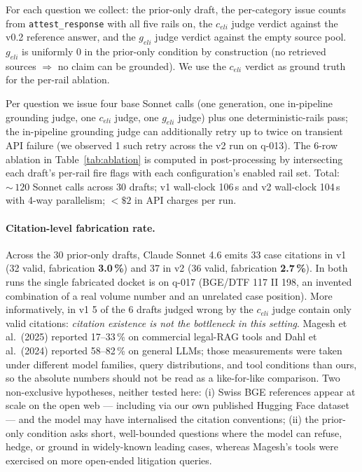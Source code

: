 \documentclass[11pt,a4paper]{article}
\begin{document}
For each question we collect: the prior-only draft,
the per-category issue counts from
\texttt{attest\_response} with all five rails on,
the $c_{eli}$ judge verdict against the v0.2 reference
answer, and the $g_{eli}$ judge verdict against the
empty source pool.  $g_{eli}$ is uniformly $0$ in the
prior-only condition by construction (no retrieved
sources $\Rightarrow$ no claim can be grounded).
We use the $c_{eli}$ verdict as ground truth for
the per-rail ablation.

Per question we issue four base Sonnet calls (one
generation, one in-pipeline grounding judge, one
$c_{eli}$ judge, one $g_{eli}$ judge) plus one
deterministic-rails pass; the in-pipeline grounding
judge can additionally retry up to twice on transient
API failure (we observed 1 such retry across the v2
run on q-013).  The 6-row ablation in
Table~\ref{tab:ablation} is computed in
post-processing by intersecting each draft's
per-rail fire flags with each configuration's
enabled rail set.  Total: ${\sim}\,120$ Sonnet calls
across 30 drafts; v1 wall-clock 106\,s and v2
wall-clock 104\,s with 4-way parallelism; ${<\!}\$2$
in API charges per run.

\paragraph{Citation-level fabrication rate.}
Across the 30 prior-only drafts, Claude Sonnet 4.6
emits 33 case citations in v1 (32 valid, fabrication
\textbf{3.0\,\%}) and 37 in v2 (36 valid, fabrication
\textbf{2.7\,\%}).  In both runs the single fabricated
docket is on q-017 (BGE/DTF 117 II 198, an invented
combination of a real volume number and an unrelated
case position).  More informatively, in v1 5 of the
6 drafts judged wrong by the $c_{eli}$ judge contain
only valid citations: \emph{citation existence is not
the bottleneck in this setting}.  Magesh et al.\ (2025) reported
17--33\,\% on commercial legal-RAG tools and Dahl
et al.\ (2024) reported 58--82\,\% on general LLMs;
those measurements were taken under different model
families, query distributions, and tool conditions
than ours, so the absolute numbers should not be
read as a like-for-like comparison.  Two
non-exclusive hypotheses, neither tested here: (i)
Swiss BGE references appear at scale on the open
web --- including via our own published Hugging
Face dataset --- and the model may have internalised
the citation conventions; (ii) the prior-only
condition asks short, well-bounded questions where
the model can refuse, hedge, or ground in
widely-known leading cases, whereas Magesh's tools
were exercised on more open-ended litigation
queries.
\end{document}
